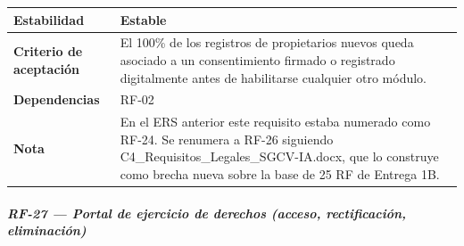 \documentclass[
]{article}
\begin{document}
{\begin{longtable}[]{|
  >{\raggedright\arraybackslash}p{}|
  >{\raggedright\arraybackslash}p{}|}
\hline
\textbf{Estabilidad} & \begin{minipage}[t]{\linewidth}\raggedright
Estable
\end{minipage} \\
\hline
\textbf{Criterio de aceptación} &
\begin{minipage}[t]{\linewidth}\raggedright
El 100\% de los registros de propietarios nuevos queda asociado a un consentimiento firmado o registrado digitalmente antes de habilitarse cualquier otro módulo.
\end{minipage} \\
\hline
\textbf{Dependencias} & \begin{minipage}[t]{\linewidth}\raggedright
RF-02
\end{minipage} \\
\hline
\textbf{Nota} & \begin{minipage}[t]{\linewidth}\raggedright
En el ERS anterior este requisito estaba numerado como RF-24. Se renumera a RF-26 siguiendo C4\_Requisitos\_Legales\_SGCV-IA.docx, que lo construye como brecha nueva sobre la base de 25 RF de Entrega 1B.
\end{minipage} \\
\hline
\end{longtable}
}

\subparagraph{RF-27 --- Portal de ejercicio de derechos (acceso, rectificación, eliminación)}\label{rf-27-portal-de-ejercicio-de-derechos-acceso-r}
\end{document}
